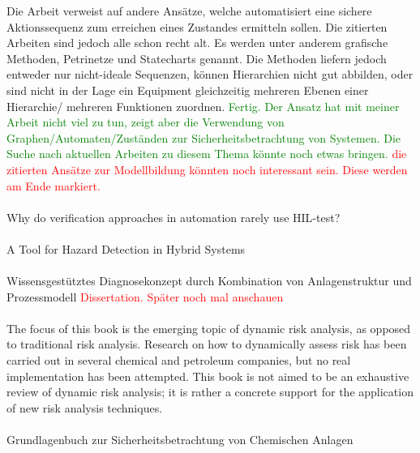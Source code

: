 Die Arbeit verweist auf andere Ans\"atze, welche automatisiert eine sichere Aktionssequenz zum erreichen eines Zustandes ermitteln sollen. Die zitierten Arbeiten sind jedoch alle schon recht alt. Es werden unter anderem grafische Methoden, Petrinetze und Statecharts genannt. Die Methoden liefern jedoch entweder nur nicht-ideale Sequenzen, k\"onnen Hierarchien nicht gut abbilden, oder sind nicht in der Lage ein Equipment gleichzeitig mehreren Ebenen einer Hierarchie/ mehreren Funktionen zuordnen.   \textcolor{green}{Fertig. Der Ansatz hat mit meiner Arbeit nicht viel zu tun, zeigt aber die Verwendung von Graphen/Automaten/Zust\"anden zur Sicherheitsbetrachtung von Systemen. Die Suche nach aktuellen Arbeiten zu diesem Thema k\"onnte noch etwas bringen.} \textcolor{red}{die zitierten Ans\"atze zur Modellbildung k\"onnten noch interessant sein. Diese werden am Ende markiert.}  

\paragraph*{\cite{Schetinin_2013}} Why do verification approaches in automation rarely use {HIL}-test?

\paragraph*{\cite{Herrmann_2000}} A Tool for Hazard Detection in Hybrid Systems

\paragraph*{\cite{Christiansen_2015}} Wissensgest{\"u}tztes Diagnosekonzept durch Kombination von Anlagenstruktur und Prozessmodell
\textcolor{red}{Dissertation. Sp\"ater noch mal anschauen}

\paragraph*{\cite{Paltrinieri_2016}}The focus of this book is the emerging topic of dynamic risk analysis, as opposed to traditional risk analysis. Research on how to dynamically assess risk has been carried out in several chemical and petroleum companies, but no real implementation has been attempted. This book is not aimed to be an exhaustive review of dynamic risk analysis; it is rather a concrete support for the application of new risk analysis techniques.

\paragraph*{\cite{Weber_2015}} Grundlagenbuch zur Sicherheitsbetrachtung von Chemischen Anlagen

